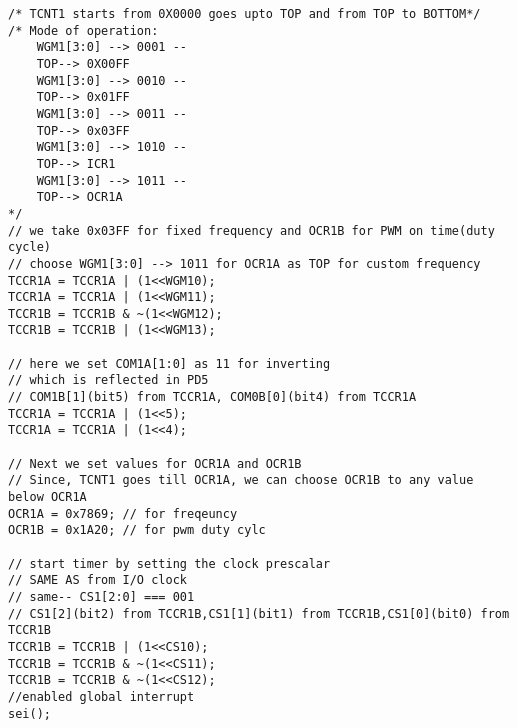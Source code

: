\documentclass{article}
\begin{document}
\begin{verbatim}
/* TCNT1 starts from 0X0000 goes upto TOP and from TOP to BOTTOM*/
/* Mode of operation:
    WGM1[3:0] --> 0001 --
    TOP--> 0X00FF
    WGM1[3:0] --> 0010 --
    TOP--> 0x01FF
    WGM1[3:0] --> 0011 --
    TOP--> 0x03FF
    WGM1[3:0] --> 1010 --
    TOP--> ICR1
    WGM1[3:0] --> 1011 --
    TOP--> OCR1A
*/
// we take 0x03FF for fixed frequency and OCR1B for PWM on time(duty cycle)
// choose WGM1[3:0] --> 1011 for OCR1A as TOP for custom frequency
TCCR1A = TCCR1A | (1<<WGM10);
TCCR1A = TCCR1A | (1<<WGM11);
TCCR1B = TCCR1B & ~(1<<WGM12);
TCCR1B = TCCR1B | (1<<WGM13);		

// here we set COM1A[1:0] as 11 for inverting
// which is reflected in PD5
// COM1B[1](bit5) from TCCR1A, COM0B[0](bit4) from TCCR1A
TCCR1A = TCCR1A | (1<<5);
TCCR1A = TCCR1A | (1<<4);
    
// Next we set values for OCR1A and OCR1B
// Since, TCNT1 goes till OCR1A, we can choose OCR1B to any value below OCR1A
OCR1A = 0x7869; // for freqeuncy
OCR1B = 0x1A20; // for pwm duty cylc

// start timer by setting the clock prescalar
// SAME AS from I/O clock
// same-- CS1[2:0] === 001
// CS1[2](bit2) from TCCR1B,CS1[1](bit1) from TCCR1B,CS1[0](bit0) from TCCR1B
TCCR1B = TCCR1B | (1<<CS10);
TCCR1B = TCCR1B & ~(1<<CS11);
TCCR1B = TCCR1B & ~(1<<CS12);
//enabled global interrupt
sei();
\end{verbatim}
\end{document}
